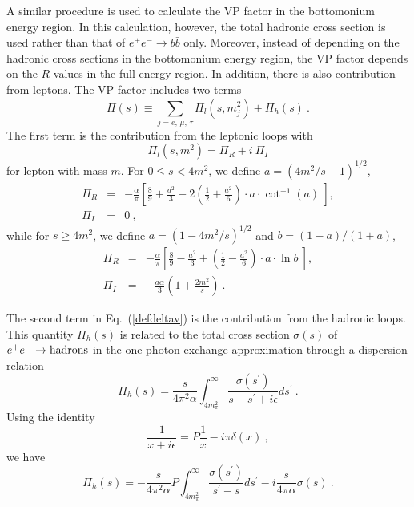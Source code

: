 \documentclass[aps,showpacs,superscriptaddress,preprint,tightenlines]{revtex4}
\newcommand{\EE}{e^+e^-}
\newcommand{\bbb}{b\bar{b}}
\newcommand{\beq}{\begin{equation}}
\newcommand{\eeq}{\end{equation}}
\def\eref#1{(\ref{#1})}
\begin{document}
A similar procedure is used to calculate the VP
factor in the bottomonium energy region. In this calculation,
however, the total hadronic cross section is used rather than 
that of $\EE\to \bbb$ only. Moreover, instead of depending
on the hadronic cross sections in the bottomonium energy region,
the VP factor depends on the $R$ values in the
full energy region. In addition, there is also contribution from
leptons.
The VP factor includes two
terms~\cite{Greiner:1994}
 \beq
 \Pi(s) \equiv \sum_{j=e,\,\mu,\,\tau} \Pi_l(s,m^2_j) + \Pi_h(s) ~.
 \label{defdeltav}
 \eeq
The first term is the contribution from the leptonic loops
with
 \beq
 \Pi_l(s,m^2) = \Pi_R+i~\Pi_I
 \label{defpilepton}
 \eeq
for lepton with mass $m$. For $0 \le s <4 m^2$, we define
$a=(4m^2/s-1)^{1/2}$,
 \beq
 \begin{array}{rcl}
 \Pi_R&=&-{\displaystyle \frac{\alpha}{\pi}
 \left[\frac{8}{9}+\frac{a^2}{3}
 -2 \left(\frac{1}{2}+\frac{a^2}{6}\right) \cdot a
 \cdot \cot^{-1}(a)~\right],
 } \\
 \Pi_I&=&{\displaystyle 0~, }
 \end{array}
 \eeq
while for $s \ge 4 m^2 $, we define $a=(1-4m^2/s)^{1/2}$ and
$b=(1-a)/(1+a)$,
 \beq
 \begin{array}{rcl}
 \Pi_R&=&-{\displaystyle \frac{\alpha}{\pi}
 \left[\frac{8}{9}-\frac{a^2}{3} +
 \left(\frac{1}{2}-\frac{a^2}{6}\right) \cdot a
 \cdot \ln b ~ \right], }\\
 \Pi_I&=& -{\displaystyle \frac{a \alpha}{3}
 \left(1+\frac{2 m^2}{s}\right)~. }
 \end{array}
 \eeq

The second term in Eq.~\eref{defdeltav} is the contribution
from the hadronic loops. This quantity $\Pi_h(s)$ is related to
the total cross section $\sigma (s)$ of $\EE \to {\rm hadrons}$
in the one-photon exchange approximation through a dispersion
relation
 \beq
\Pi_h(s)= \frac{s}{4\pi^2 \alpha} \int_{4m^2_{\pi}}^{\infty}
\frac{\sigma (s^{\prime})}{s-s^{\prime}+i\epsilon } d s^{\prime}~.
\label{dspnrelationa}
 \eeq
Using the identity
$$\frac{1}{x+i\epsilon} = P\frac{1}{x}-i\pi \delta(x)~, $$
we have
 \beq
\Pi_h(s)=- \frac{s}{4\pi^2 \alpha} P \int_{4m^2_{\pi}}^{\infty}
\frac{\sigma (s^{\prime})}{s^{\prime}-s} d s^{\prime} - i
\frac{s}{4\pi \alpha} \sigma(s)~. \label{dspnrelationb}
 \eeq
\end{document}
